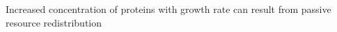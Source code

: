 Increased concentration of proteins with growth rate can result from passive resource redistribution